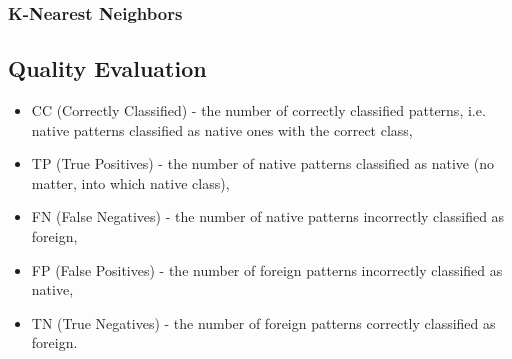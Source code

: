 \documentclass{llncs}
\begin{document}
\subsubsection{K-Nearest Neighbors}

\subsection{Quality Evaluation}

\begin{itemize}
\item CC  (Correctly Classified) - the number of correctly classified patterns, i.e. native patterns classified as native ones with the correct class, %
\item TP  (True Positives) - the number of native patterns classified as native (no matter, into which native class),
\item FN  (False Negatives) - the number of native patterns incorrectly classified as foreign,
\item FP  (False Positives) - the number of foreign patterns incorrectly classified as native,
\item TN  (True Negatives) - the number of foreign patterns correctly classified as foreign.
\end{itemize}
\end{document}
